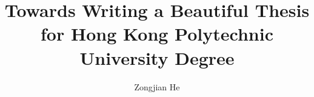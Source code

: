 \documentclass[12pt]{hkputhesis}
\begin{document}
\title{Towards Writing a Beautiful Thesis\\ for Hong Kong Polytechnic University Degree}
\author{Zongjian He}

\frontmatter
\mainmatter


\end{document}
